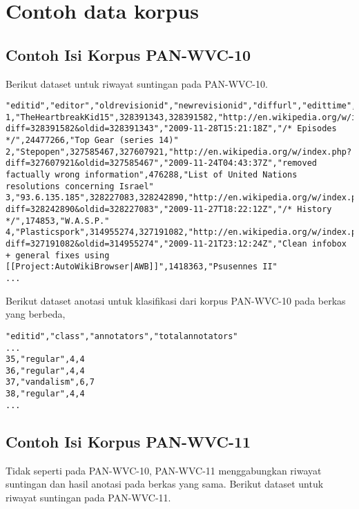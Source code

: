 \newpage
\appendix
\section{Contoh data korpus}

\subsection{Contoh Isi Korpus PAN-WVC-10}

Berikut dataset untuk riwayat suntingan pada PAN-WVC-10.

\begin{lstlisting}
"editid","editor","oldrevisionid","newrevisionid","diffurl","edittime","editcomment","articleid","articletitle"
1,"TheHeartbreakKid15",328391343,328391582,"http://en.wikipedia.org/w/index.php?diff=328391582&oldid=328391343","2009-11-28T15:21:18Z","/* Episodes */",24477266,"Top Gear (series 14)"
2,"Stepopen",327585467,327607921,"http://en.wikipedia.org/w/index.php?diff=327607921&oldid=327585467","2009-11-24T04:43:37Z","removed factually wrong information",476288,"List of United Nations resolutions concerning Israel"
3,"93.6.135.185",328227083,328242890,"http://en.wikipedia.org/w/index.php?diff=328242890&oldid=328227083","2009-11-27T18:22:12Z","/* History */",174853,"W.A.S.P."
4,"Plasticspork",314955274,327191082,"http://en.wikipedia.org/w/index.php?diff=327191082&oldid=314955274","2009-11-21T23:12:24Z","Clean infobox + general fixes using [[Project:AutoWikiBrowser|AWB]]",1418363,"Psusennes II"
...
\end{lstlisting}

Berikut dataset anotasi untuk klasifikasi dari korpus PAN-WVC-10 pada berkas yang berbeda,

\begin{lstlisting}
"editid","class","annotators","totalannotators"
...
35,"regular",4,4
36,"regular",4,4
37,"vandalism",6,7
38,"regular",4,4
...
\end{lstlisting}

\newpage
\subsection{Contoh Isi Korpus PAN-WVC-11}

Tidak seperti pada PAN-WVC-10, PAN-WVC-11 menggabungkan riwayat suntingan dan hasil anotasi pada berkas yang sama.
Berikut dataset untuk riwayat suntingan pada PAN-WVC-11.

